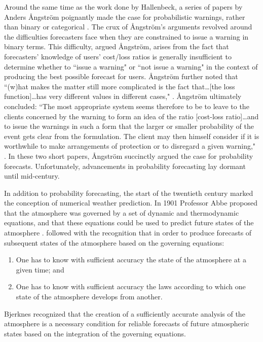 Around the same time as the work done by Hallenbeck, a series of papers by Anders {{\AA}}ngstr{{\"o}}m poignantly made the case for probabilistic warnings, rather than binary or categorical \citep{Angstrom1919, Angstrom1922, Liljas1994, Murphy1998}.
The crux of {{\AA}}ngstr{{\"o}}m's arguments revolved around the difficulties forecasters face when they are constrained to issue a warning in binary terms.
This difficulty, argued {{\AA}}ngstr{{\"o}}m, arises from the fact that forecasters' knowledge of users' cost/loss ratios is generally insufficient to determine whether to ``issue a warning" or ``not issue a warning" in the context of producing the best possible forecast for users.
{{\AA}}ngstr{{\"o}}m further noted that ``(w)hat makes the matter still more complicated is the fact that\dots [the loss function]\dots has very different values in different cases," \citep{Angstrom1922, Murphy1998}. {{\AA}}ngstr{{\"o}}m ultimately concluded: ``The most appropriate system seems therefore to be to leave to the clients concerned by the warning to form an idea of the ratio [cost-loss ratio]\dots and to issue the warnings in such a form that the larger or smaller probability of the event gets clear from the formulation.
The client may then himself consider if it is worthwhile to make arrangements of protection or to disregard a given warning," \citep{Angstrom1922, Murphy1998}.
In these two short papers, {{\AA}}ngstr{{\"o}}m succinctly argued the case for probability forecasts.
Unfortunately, advancements in probability forecasting lay dormant until mid-century.


In addition to probability forecasting, the start of the twentieth century marked the conception of numerical weather prediction.
In 1901 Professor Abbe proposed that the atmosphere was governed by a set of dynamic and thermodynamic equations, and that these equations could be used to predict future states of the atmosphere \citep{Abbe1901}.
\cite{Bjerknes1904} followed with the recognition that in order to produce forecasts of subsequent states of the atmosphere based on the governing equations:
\begin{enumerate}
    \item One has to know with sufficient accuracy the state of the atmosphere at a given time; and
    \item One has to know with sufficient accuracy the laws according to which one state of the atmosphere develops from another.
\end{enumerate}
Bjerknes recognized that the creation of a sufficiently accurate analysis of the atmosphere is a necessary condition for reliable forecasts of future atmospheric states based on the integration of the governing equations.


